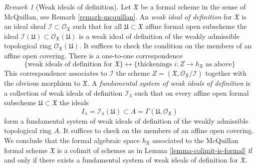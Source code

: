 \documentclass{stacks-project}
\theoremstyle{plain}
\theoremstyle{definition}
\theoremstyle{remark}
\newtheorem{remark}[subsection]{Remark}
\numberwithin{equation}{subsection}
\begin{document}
\begin{remark}[Weak ideals of definition]
\label{remark-weak-ideals-of-definition}
Let $\mathfrak X$ be a formal scheme in the sense of McQuillan, see
Remark \ref{remark-mcquillan}. An {\it weak ideal of definition}
for $\mathfrak X$ is an ideal sheaf
$\mathcal{I} \subset \mathcal{O}_\mathfrak X$ such that
for all $\mathfrak U \subset \mathfrak X$ affine formal open subscheme
the ideal
$\mathcal{I}(\mathfrak U) \subset \mathcal{O}_\mathfrak X(\mathfrak U)$
is a weak ideal of definition of the weakly admissible topological ring
$\mathcal{O}_\mathfrak X(\mathfrak U)$.
It suffices to check the condition on the members of an affine open covering.
There is a one-to-one correspondence
$$
\{\text{weak ideals of definition for }\mathfrak X\}
\leftrightarrow
\{\text{thickenings }i : Z \to h_\mathfrak X\text{ as above}\}
$$
This correspondence associates to $\mathcal{I}$ the scheme
$Z = (\mathfrak X, \mathcal{O}_\mathfrak X/\mathcal{I})$
together with the obvious morphism to $\mathfrak X$.
A {\it fundamental system of weak ideals of definition}
is a collection of weak ideals of definition
$\mathcal{I}_\lambda$ such that on every affine open
formal subscheme $\mathfrak U \subset \mathfrak X$ the
ideals
$$
I_\lambda = \mathcal{I}_\lambda(\mathfrak U) \subset
A = \Gamma(\mathfrak U, \mathcal{O}_\mathfrak X)
$$
form a fundamental system of weak ideals of definition of the
weakly admissible topological ring $A$. It suffices to check
on the members of an affine open covering. We conclude that
the formal algebraic space $h_\mathfrak X$ associated to
the McQuillan formal scheme $\mathfrak X$ is a colimit of schemes as
in Lemma \ref{lemma-colimit-is-formal} if and only if
there exists a fundamental system of weak ideals of definition
for $\mathfrak X$.
\end{remark}
\end{document}
